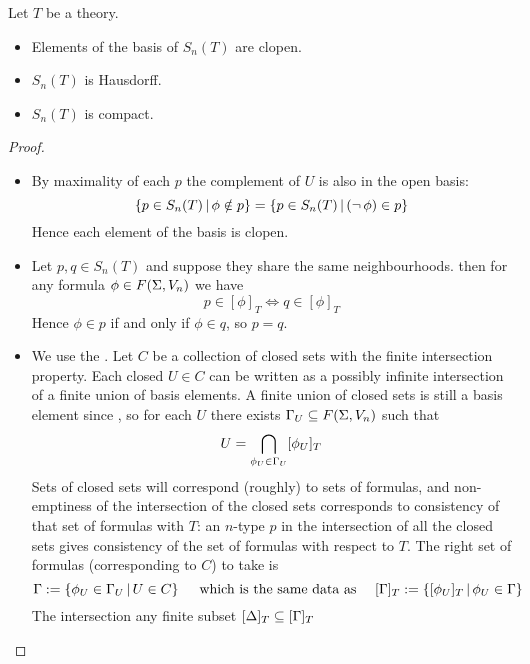 \begin{prop}
    Let $T$ be a theory.
    \begin{itemize}
        \item Elements of the basis of $S_n(T)$ are clopen.
        \item $S_n(T)$ is Hausdorff.
        \item $S_n(T)$ is compact.
    \end{itemize}
\end{prop}
\begin{proof}~
\begin{itemize}
    \item By maximality of each $p$ the complement of $U$ is also 
        in the open basis:
        \[  
            \left\{p \in S_n(T) \,|\, \phi \notin p\right\}
            = \left\{p \in S_n(T) \,|\, (\neg\, \phi) \in p\right\}
        \]
        Hence each element of the basis is clopen.
    \item Let $p,q \in S_n(T)$ and suppose they share the same neighbourhoods.
        then for any formula $\phi \in F(\Sigma,V_n)$ we have 
        \[ p \in [\phi]_T \iff q \in [\phi]_T\]
        Hence $\phi \in p$ if and only if $\phi \in q$, so $p = q$.
    \item We use the
        .
        Let $C$ be a collection of closed sets with the finite intersection
        property.
        Each closed $U \in C$ can be written as a possibly infinite 
        intersection of a finite union of basis elements.
        A finite union of closed sets is still a basis element
        since ,
        so for each $U$ there exists $\Gamma_U \subseteq F(\Sigma,V_n)$ such that
        \[
            U = \bigcap_{\phi_U \in \Gamma_U}[\phi_U]_T
        \]
        Sets of closed sets will correspond (roughly) to sets of formulas, and
        non-emptiness of the intersection of the closed sets corresponds to 
        consistency of that set of formulas with $T$:
        an $n$-type $p$ in the intersection of all the closed sets gives 
        consistency of the set of formulas with respect to $T$.
        The right set of formulas (corresponding to $C$) to take is 
        \[
            \Gamma := \left\{\phi_U \in \Gamma_U \,|\, U \in C\right\} 
            \quad \text{ which is the same data as } \quad 
            [\Gamma]_T := \left\{[\phi_U]_T \,|\, \phi_U \in \Gamma\right\}
        \]
        The intersection any finite subset $[\Delta]_T \subseteq [\Gamma]_T$ 

\end{itemize}
\end{proof}
